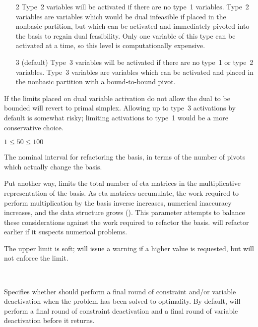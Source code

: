 \begin{codedoc}
\begin{itemize}
    \item[2]
    Type~2 variables will be activated if there are no type~1 variables.
    Type~2 variables are variables which would be dual infeasible if placed
    in the nonbasic partition, but which can be activated and immediately
    pivoted into the basis to regain dual feasibility.
    Only one variable of this type can be activated at a time, so this
    level is computationally expensive.

    \item[3] (default)
    Type~3 variables will be activated if there are no type~1 or
    type~2 variables.
    Type~3 variables are variables which can be activated and placed in the
    nonbasic partition with a bound-to-bound pivot.
  \end{itemize}
  If the limits placed on dual variable activation do not allow the dual
  to be bounded \dylp will revert to primal simplex.
  Allowing up to type~3 activations by default is somewhat risky; limiting
  activations to type~1 would be a more conservative choice.

  \item{}
    \kw{;}

  $1 \leq 50 \leq 100$

  The nominal interval for refactoring the basis, in terms of the number of
  pivots which actually change the basis.

  Put another way,  limits the total number of eta matrices
  in the multiplicative representation of the basis.
  As eta matrices accumulate, the work required to perform multiplication by
  the basis inverse increases, numerical inaccuracy increases, and the data
  structure grows (\vid {}).
  This parameter attempts to balance these considerations against the work
  required to refactor the basis.
  \dylp will refactor earlier if it suspects numerical problems.

  The upper limit is soft; \dylp will issue a warning if a higher value is
  requested, but will not enforce the limit.

  \item{}

  \bgroup \raggedright
     \kw{;} \\
    
  \egroup

  Specifies whether \dylp should perform a final round of constraint and/or
  variable deactivation when the problem has been solved to optimality.
  By default, \dylp will perform a final round of constraint deactivation and a
  final round of variable deactivation before it returns.


\end{codedoc}
